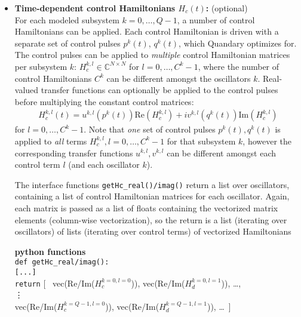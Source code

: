 \documentclass[11pt]{article}
\newcommand{\C}{\mathds{C}}
\begin{document}
\begin{itemize}
 \item \textbf{Time-dependent control Hamiltonians $H_c(t)$:} (optional) \\
 For each modeled subsystem $k=0,\dots, Q-1$, a number of control Hamiltonians can be applied. Each control Hamiltonian is driven with a separate set of control pulses $p^k(t)$, $q^k(t)$, which Quandary optimizes for. The control pulses can be applied to \textit{multiple} control Hamiltonian matrices per subsystem $k$: $H_c^{k,l}\in \C^{N\times N}$ for $l=0,\dots, C^k-1$, where the number of control Hamiltonians $C^k$ can be different amongst the oscillators $k$. Real-valued transfer functions can optionally be applied to the control pulses before multiplying the constant control matrices:
  \begin{align}
  H_{c}^{k,l}(t) =  u^{k,l}\left(p^k(t)\right) \mbox{Re}\left(H_{c}^{k,l}\right)
    + i v^{k,l}\left(q^k(t)\right) \mbox{Im}\left(H_{c}^{k,l}\right)
  \end{align}
  for $l=0,\dots, C^k-1$. Note that \textit{one} set of control pulses $p^k(t), q^k(t)$ is applied to \textit{all} terms $H_c^{k,l}, l=0,\dots, C^k-1$ for that subsystem $k$, however the corresponding transfer functions $u^{k,l}, v^{k,l}$ can be different amongst each control term $l$ (and each oscillator $k$).

  The interface functions \texttt{getHc\_real()/imag()} return a list over oscillators, containing a list of control Hamiltonian matrices for each oscillator. Again, each matrix is passed as a list of floats containing the vectorized matrix elements (column-wise vectorization), so the return is a list (iterating over oscillators) of lists (iterating over control terms) of vectorized Hamiltonians

 \textbf{python functions} \\
  \texttt{def getHc\_real/imag():} \\
  \indent\hspace{1cm}\texttt{[...]}   \\
  \indent\hspace{1cm}\texttt{return} [ \, vec(Re/Im($H_c^{k=0,l=0}$)), vec(Re/Im($H_d^{k=0,l=1}$)), \dots,\\
  \indent\hspace{17ex} \vdots    \\
  \indent\hspace{16ex}  vec(Re/Im($H_c^{k=Q-1,l=0}$)), vec(Re/Im($H_d^{k=Q-1,l=1}$)), \dots \, ]
  



\end{itemize}
\end{document}
